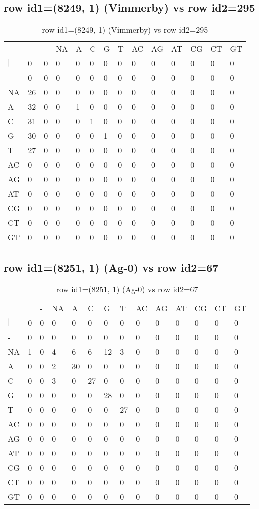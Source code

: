 \subsection{row id1=(8249, 1) (Vimmerby) vs row id2=295}
\begin{center}
\begin{longtable}{|l|l|l|l|l|l|l|l|l|l|l|l|l|l|}
\caption{row id1=(8249, 1) (Vimmerby) vs row id2=295} \label{table_dm388}\\
\hline
\\
\hline
&$|$&-&NA&A&C&G&T&AC&AG&AT&CG&CT&GT\\
$|$&0&0&0&0&0&0&0&0&0&0&0&0&0\\
-&0&0&0&0&0&0&0&0&0&0&0&0&0\\
NA&26&0&0&0&0&0&0&0&0&0&0&0&0\\
A&32&0&0&1&0&0&0&0&0&0&0&0&0\\
C&31&0&0&0&1&0&0&0&0&0&0&0&0\\
G&30&0&0&0&0&1&0&0&0&0&0&0&0\\
T&27&0&0&0&0&0&0&0&0&0&0&0&0\\
AC&0&0&0&0&0&0&0&0&0&0&0&0&0\\
AG&0&0&0&0&0&0&0&0&0&0&0&0&0\\
AT&0&0&0&0&0&0&0&0&0&0&0&0&0\\
CG&0&0&0&0&0&0&0&0&0&0&0&0&0\\
CT&0&0&0&0&0&0&0&0&0&0&0&0&0\\
GT&0&0&0&0&0&0&0&0&0&0&0&0&0\\
\hline
\end{longtable}
\end{center}

\subsection{row id1=(8251, 1) (Ag-0) vs row id2=67}
\begin{center}
\begin{longtable}{|l|l|l|l|l|l|l|l|l|l|l|l|l|l|}
\caption{row id1=(8251, 1) (Ag-0) vs row id2=67} \label{table_dm390}\\
\hline
\\
\hline
&$|$&-&NA&A&C&G&T&AC&AG&AT&CG&CT&GT\\
$|$&0&0&0&0&0&0&0&0&0&0&0&0&0\\
-&0&0&0&0&0&0&0&0&0&0&0&0&0\\
NA&1&0&4&6&6&12&3&0&0&0&0&0&0\\
A&0&0&2&30&0&0&0&0&0&0&0&0&0\\
C&0&0&3&0&27&0&0&0&0&0&0&0&0\\
G&0&0&0&0&0&28&0&0&0&0&0&0&0\\
T&0&0&0&0&0&0&27&0&0&0&0&0&0\\
AC&0&0&0&0&0&0&0&0&0&0&0&0&0\\
AG&0&0&0&0&0&0&0&0&0&0&0&0&0\\
AT&0&0&0&0&0&0&0&0&0&0&0&0&0\\
CG&0&0&0&0&0&0&0&0&0&0&0&0&0\\
CT&0&0&0&0&0&0&0&0&0&0&0&0&0\\
GT&0&0&0&0&0&0&0&0&0&0&0&0&0\\
\hline
\end{longtable}
\end{center}

